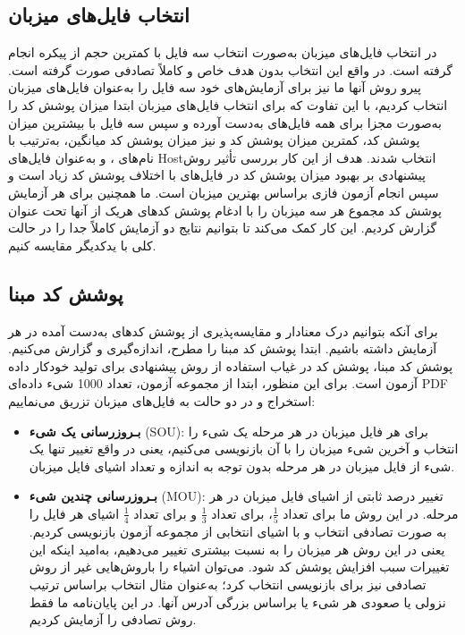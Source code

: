  \subsection{انتخاب فایل‌های میزبان}
 در 
 \cite{Godefroid:2017:LML:3155562.3155573}
 انتخاب فایل‌های میزبان به‌صورت انتخاب سه فایل با کمترین حجم از پیکره انجام گرفته است. در واقع این انتخاب بدون هدف خاص و کاملاً تصادفی صورت ‌گرفته است. پیرو روش آنها ما نیز برای آزمایش‌های خود سه فایل را به‌عنوان فایل‌های میزبان انتخاب کردیم، با این تفاوت که برای انتخاب فایل‌های میزبان ابتدا میزان پوشش کد را به‌صورت مجزا برای همه فایل‌های 
 به‌دست آورده و سپس سه فایل با بیشترین میزان پوشش کد، کمترین میزان پوشش کد و نیز میزان پوشش کد میانگین، به‌ترتیب با نام‌های ،  و  به‌عنوان فایل‌های \gls{Host}انتخاب شدند. هدف از این کار بررسی تأثیر روش پیشنهادی بر بهبود میزان پوشش کد در فایل‌های با اختلاف پوشش کد زیاد است و سپس انجام آزمون فازی براساس بهترین میزبان است. ما همچنین برای هر آزمایش پوشش کد مجموع هر سه میزبان را با ادغام پوشش کد‌های هریک از آنها تحت عنوان 
گزارش کردیم. این کار کمک می‌کند تا بتوانیم نتایج دو آزمایش کاملاً جدا را در حالت کلی با یدکدیگر مقایسه کنیم.
 
 
 
 
 \subsection{پوشش کد مبنا}
 برای آنکه بتوانیم درک معنادار و مقایسه‌پذیری از پوشش کد‌های به‌دست آمده در هر آزمایش داشته باشیم. ابتدا پوشش کد مبنا را مطرح، اندازه‌گیری و گزارش می‌کنیم. پوشش کد مبنا، پوشش کد در غیاب استفاده از روش پیشنهادی برای تولید خودکار داده آزمون است. برای این منظور، ابتدا از مجموعه آزمون، تعداد 1000 شیء داده‌ای \gls{PDF} استخراج و در دو حالت به فایل‌های میزبان تزریق می‌نماییم:
  
  \begin{itemize}
  	\item {
  	
   \textbf{بـروزرسانی یک شیء }(\gls{SOU}):
برای هر فایل میزبان در هر مرحله یک شیء را انتخاب و آخرین شیء میزبان را با آن بازنویسی می‌کنیم، یعنی در واقع تغییر تنها یک شیء از فایل میزبان در هر مرحله بدون توجه به اندازه و تعداد اشیای فایل میزبان.
}
  	
  	\item {
  	\textbf{بـروزرسانی چندین شیء }(\gls{MOU}):
  تغییر درصد ثابتی از اشیای فایل میزبان در هر مرحله. در این روش ما برای  تعداد 
  $\frac{1}{5}$، برای  تعداد 
   $\frac{1}{3}$
  و برای  تعداد 
   $\frac{1}{4}$
  اشیای هر فایل را به صورت تصادفی انتخاب و با اشیای انتخابی از مجموعه آزمون بازنویسی کردیم. یعنی در این روش هر میزبان را به نسبت‌ بیشتری تغییر می‌دهیم، به‌امید اینکه این تغییرات سبب افزایش پوشش کد شود. می‌توان اشیاء را باروش‌هایی غیر از روش تصادفی نیز برای بازنویسی انتخاب کرد؛ به‌عنوان مثال انتخاب براساس ترتیب نزولی یا صعودی  هر شیء یا براساس بزرگی آدرس آنها. در این پایان‌نامه ما فقط روش تصادفی را آزمایش کردیم.
  	
  	}
  	
  \end{itemize}
  
